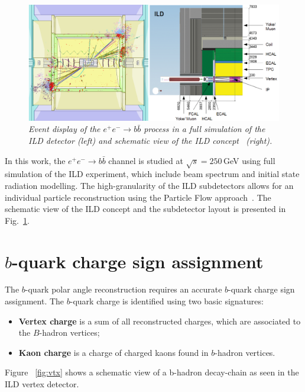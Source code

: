 \documentclass{PoS}
\begin{document}
\begin{figure}
	{\centering
		\includegraphics[width=0.8\linewidth]{../poster/figures/ild3.png}
		\caption{\sl Event display of the $e^+ e^-\to b\bar{b}$ process in a full simulation of the ILD detector (left) and schematic view of the ILD concept~\cite{Behnke:2013lya} (right). }
		\label{fig:ILDScheme}
	}
\end{figure}

In this work, the $e^+ e^-\to b\bar{b}$ channel is studied at $\sqrt{s}=250$\,GeV using full simulation of the ILD experiment, which include beam spectrum and initial state radiation modelling.
The high-granularity of the ILD subdetectors allows for an individual particle reconstruction using the Particle Flow approach~\cite{Marshall:2015rfa}.
The schematic view of the ILD concept and the subdetector layout is presented in Fig.~\ref{fig:ILDScheme}.



\section{$b$-quark charge sign assignment}

The $b$-quark polar angle reconstruction requires an accurate $b$-quark charge sign assignment. 
The $b$-quark charge is identified using two basic signatures:
\begin{itemize}
	\item \textbf{Vertex charge} is a sum of all reconstructed charges, which are associated to the $B$-hadron vertices;
	\item \textbf{Kaon charge} is a charge of charged kaons found in $b$-hadron vertices. 
\end{itemize}

Figure ~\ref{fig:vtx} shows a schematic view of a b-hadron decay-chain as seen in the ILD vertex detector.
\end{document}
